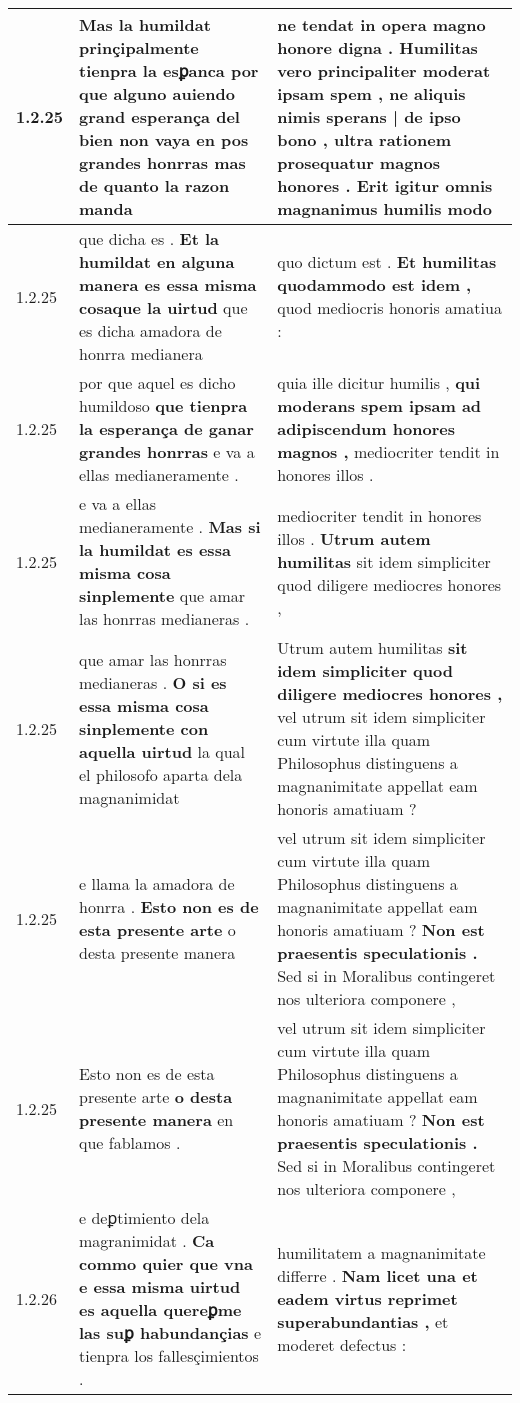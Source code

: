 \begin{tabular}{|p{1cm}|p{6.5cm}|p{6.5cm}|}
1.2.25 & Mas la humildat prinçipalmente tienpra la esꝑanca \textbf{ por que alguno auiendo grand esperança del bien non vaya en pos grandes honrras } mas de quanto la razon manda & ne tendat in opera magno honore digna . Humilitas vero principaliter moderat ipsam spem , \textbf{ ne aliquis nimis sperans | de ipso bono , ultra rationem prosequatur magnos honores . } Erit igitur omnis magnanimus humilis modo \\\hline
1.2.25 & que dicha es . \textbf{ Et la humildat en alguna manera es essa misma cosaque la uirtud } que es dicha amadora de honrra medianera & quo dictum est . \textbf{ Et humilitas quodammodo est idem , } quod mediocris honoris amatiua : \\\hline
1.2.25 & por que aquel es dicho humildoso \textbf{ que tienpra la esperança de ganar grandes honrras } e va a ellas medianeramente . & quia ille dicitur humilis , \textbf{ qui moderans spem ipsam ad adipiscendum honores magnos , } mediocriter tendit in honores illos . \\\hline
1.2.25 & e va a ellas medianeramente . \textbf{ Mas si la humildat es essa misma cosa sinplemente } que amar las honrras medianeras . & mediocriter tendit in honores illos . \textbf{ Utrum autem humilitas } sit idem simpliciter quod diligere mediocres honores , \\\hline
1.2.25 & que amar las honrras medianeras . \textbf{ O si es essa misma cosa sinplemente con aquella uirtud } la qual el philosofo aparta dela magnanimidat & Utrum autem humilitas \textbf{ sit idem simpliciter quod diligere mediocres honores , } vel utrum sit idem simpliciter cum virtute illa quam Philosophus distinguens a magnanimitate appellat eam honoris amatiuam ? \\\hline
1.2.25 & e llama la amadora de honrra . \textbf{ Esto non es de esta presente arte } o desta presente manera & vel utrum sit idem simpliciter cum virtute illa quam Philosophus distinguens a magnanimitate appellat eam honoris amatiuam ? \textbf{ Non est praesentis speculationis . } Sed si in Moralibus contingeret nos ulteriora componere , \\\hline
1.2.25 & Esto non es de esta presente arte \textbf{ o desta presente manera } en que fablamos . & vel utrum sit idem simpliciter cum virtute illa quam Philosophus distinguens a magnanimitate appellat eam honoris amatiuam ? \textbf{ Non est praesentis speculationis . } Sed si in Moralibus contingeret nos ulteriora componere , \\\hline
1.2.26 & e deꝑtimiento dela magranimidat . \textbf{ Ca commo quier que vna e essa misma uirtud es aquella quereꝑme las suꝑ habundançias } e tienpra los fallesçimientos . & humilitatem a magnanimitate differre . \textbf{ Nam licet una et eadem virtus reprimet superabundantias , } et moderet defectus : \\\hline

\end{tabular}

